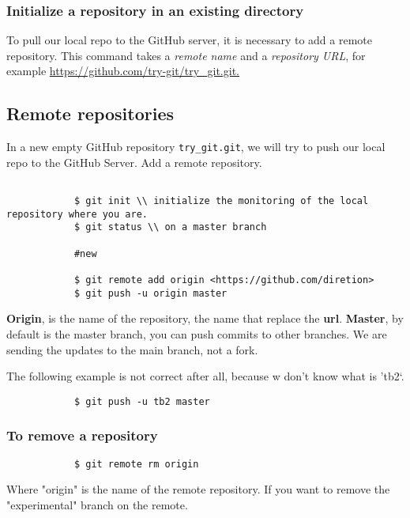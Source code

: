 \documentclass[12pt]{article}
\begin{document}
		\subsubsection{Initialize a repository in an existing directory}

			To pull our local repo to the GitHub server, it is necessary to add a remote repository. This command takes a \textit{remote name} and a \textit{repository URL}, for example \url{ https://github.com/try-git/try_git.git.}

	\subsection{Remote repositories}

			In a new empty GitHub repository \verb|try_git.git|, we will
			try to push our local repo to the GitHub Server.
			Add a remote repository.

			\begin{verbatim}

			$ git init \\ initialize the monitoring of the local repository where you are.
			$ git status \\ on a master branch

			#new 

			$ git remote add origin <https://github.com/diretion>
			$ git push -u origin master
			\end{verbatim}

			\textbf{Origin}, is the name of the repository, the name that replace the \textbf{url}. \textbf{Master}, by default is the
			master branch, you can push commits to other branches. We are sending the updates to the main branch, not a fork.

			The following example is not correct after all, because w don't know what is 'tb2`.

			\begin{verbatim}
			$ git push -u tb2 master
			\end{verbatim}

			\subsubsection{To remove a repository}

			\begin{verbatim}
			$ git remote rm origin
			\end{verbatim}

			Where "origin" is the name of the remote repository. If you want to
			remove the "experimental" branch on the remote.
\end{document}
